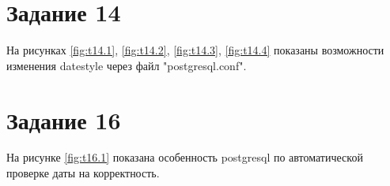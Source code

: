 \begin{myfigure}{12.3}
  \caption{Экспериментирование с datestyle, часть 3}
  \label{fig:t12.3}
\end{myfigure}

\begin{myfigure}{12.4}
  \caption{Экспериментирование с datestyle, часть 4}
  \label{fig:t12.4}
\end{myfigure}

\begin{myfigure}{12.5}
  \caption{Экспериментирование с datestyle, часть 5}
  \label{fig:t12.5}
\end{myfigure}

\section{Задание 14}

На рисунках \ref{fig:t14.1}, \ref{fig:t14.2}, \ref{fig:t14.3}, \ref{fig:t14.4} показаны возможности изменения datestyle через файл "postgresql.conf".

\begin{myfigure}{14.1}
  \caption{Экспериментирование с datestyle, часть 1}
  \label{fig:t14.1}
\end{myfigure}

\begin{myfigure}{14.2}
  \caption{Экспериментирование с datestyle, часть 2}
  \label{fig:t14.2}
\end{myfigure}

\begin{myfigure}{14.3}
  \caption{Экспериментирование с datestyle, часть 2}
  \label{fig:t14.3}
\end{myfigure}

\begin{myfigure}{14.4}
  \caption{Экспериментирование с datestyle, часть 2}
  \label{fig:t14.4}
\end{myfigure}

\section{Задание 16}

На рисунке \ref{fig:t16.1} показана особенность postgresql по автоматической проверке даты на корректность.

\begin{myfigure}{16.1}
  \caption{Ввод недопустимого значения}
  \label{fig:t16.1}
\end{myfigure}

